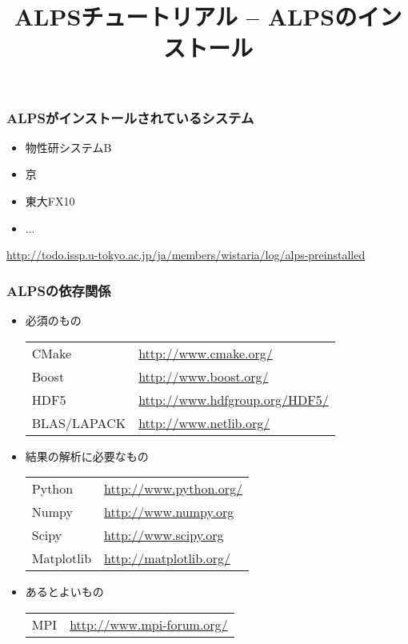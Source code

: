 \title{ALPSチュートリアル -- ALPSのインストール}



\begin{frame}
  \titlepage
\end{frame}


\begin{frame}[fragile,shrink=15]
  \frametitle{ALPSがインストールされているシステム}
  \begin{itemize}
  \item 物性研システムB
  \item 京
  \item 東大FX10
  \item ...
  \end{itemize}
\begin{semiverbatim}
\url{http://todo.issp.u-tokyo.ac.jp/ja/members/wistaria/log/alps-preinstalled}
\end{semiverbatim}
\end{frame}

\begin{frame}
  \frametitle{ALPSの依存関係}
  \begin{itemize}
  \item<1-> 必須のもの\\
    \begin{tabular}{ll}
      CMake & \url{http://www.cmake.org/} \\
      Boost & \url{http://www.boost.org/} \\
      HDF5  & \url{http://www.hdfgroup.org/HDF5/} \\
      BLAS/LAPACK & \url{http://www.netlib.org/} \\
    \end{tabular}
  \item<2-> 結果の解析に必要なもの \\
    \begin{tabular}{ll}
      Python & \url{http://www.python.org/} \\
      Numpy & \url{http://www.numpy.org} \\
      Scipy & \url{http://www.scipy.org} \\
      Matplotlib & \url{http://matplotlib.org/}
    \end{tabular}
  \item<3-> あるとよいもの \\
    \begin{tabular}{ll}
      MPI & \url{http://www.mpi-forum.org/} \\
    \end{tabular}
  \end{itemize}
\end{frame}

